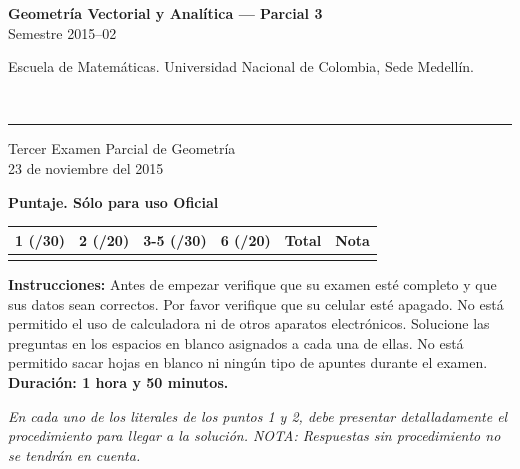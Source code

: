 \documentclass[11pt]{article}
\newcommand{\examheader}{%
  \noindent
  \begin{minipage}[t]{0.6\linewidth}
    {\small\bfseries Geometría Vectorial y Analítica --- Parcial 3}\\
    {\small Semestre 2015--02}
  \end{minipage}%
  \hfill
  \begin{minipage}[t]{0.35\linewidth}
    \raggedleft\small Escuela de Matemáticas. Universidad Nacional de Colombia, Sede Medellín.
  \end{minipage}\\[2pt]
  \rule{\linewidth}{0.6pt}
}
\newcommand{\nota}[1]{{\small\itshape\color{unalblue!70!black} #1}}
\begin{document}
\examheader

\begin{center}
{\large Tercer Examen Parcial de Geometría}\\[4pt]
{\small 23 de noviembre del 2015}
\end{center}

\vspace{6pt}
\textbf{Puntaje. Sólo para uso Oficial}

\begin{center}
\begin{tabular}{|c|c|c|c|c|c|}
\hline
1 (/30) & 2 (/20) & 3-5 (/30) & 6 (/20) & Total & Nota \\
\hline
 & & & & & \\
\hline
\end{tabular}
\end{center}

\vspace{10pt}
\textbf{Instrucciones:} Antes de empezar verifique que su examen esté completo y que sus datos sean correctos. Por favor verifique que su celular esté apagado. No está permitido el uso de calculadora ni de otros aparatos electrónicos. Solucione las preguntas en los espacios en blanco asignados a cada una de ellas. No está permitido sacar hojas en blanco ni ningún tipo de apuntes durante el examen. \textbf{Duración: 1 hora y 50 minutos.}

\vspace{6pt}
\nota{En cada uno de los literales de los puntos 1 y 2, debe presentar detalladamente el procedimiento para llegar a la solución. NOTA: Respuestas sin procedimiento no se tendrán en cuenta.}
\end{document}
